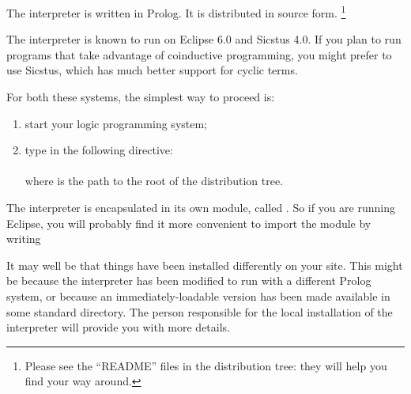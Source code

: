 
The interpreter is written in Prolog.  It is distributed in source
form.%
\footnote{
  Please see the ``README'' files in the distribution tree: they will help you
  find your way around.}

The interpreter is known to run on Eclipse 6.0 and Sicstus 4.0.  If you plan
to run programs that take advantage of coinductive programming, you might
prefer to use Sicstus, which has much better support for cyclic terms.

For both these systems, the simplest way to proceed is:
\begin{enumerate}
\item
  start your logic programming system;
\item
  type in the following directive:\\
  \ind\prog{:-~[~'}\prog{/tabling/dra'~]}\\
  where  is the path to the root of the distribution tree.
\end{enumerate}

The interpreter is encapsulated in its own module, called .  So if
you are running Eclipse, you will probably find it more convenient to import
the module by writing\\
\ind{}\label{import-dra}

It may well be that things have been installed differently on your site.
This might be because the interpreter has been modified to run with a
different Prolog system, or because an immediately-loadable version has been
made available in some standard directory. The person responsible for the
local installation of the interpreter will provide you with more details.
